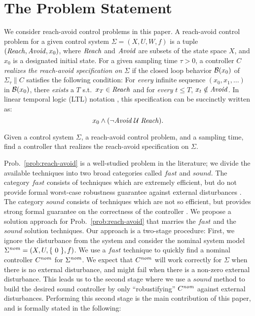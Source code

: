 
\section{The Problem Statement}

We consider reach-avoid control problems in this paper.
A reach-avoid control problem for a given control system $\Sigma=(X,U,W,f)$ is a tuple $(\mathit{Reach},\mathit{Avoid},x_0)$, where $\mathit{Reach}$ and $\mathit{Avoid}$ are subsets of the state space $X$, and $x_0$ is a designated initial state.
For a given sampling time $\tau>0$, a controller $C$ \emph{realizes the reach-avoid specification on} $\Sigma$ if the closed loop behavior $\mathcal{B}(x_0)$ of $\Sigma_\tau\parallel C$ satisfies the following condition: For \emph{every} infinite sequence $(x_0,x_1,\ldots)$ in $\mathcal{B}(x_0)$, there \emph{exists} a $T$ s.t.\ $x_T\in \mathit{Reach}$ and for \emph{every} $t\leq T$, $x_t\notin \mathit{Avoid}$. 
In linear temporal logic (LTL) notation \cite{Baier book}, this specification can be succinctly written as:
\begin{equation}
	x_0 \wedge (\lnot \mathit{Avoid}\; \mathcal{U}\;\mathit{Reach}).
\end{equation}

\begin{problem}\label{prob:reach-avoid}
	Given a control system $\Sigma$, a reach-avoid control problem, and a sampling time, find a controller that realizes the reach-avoid specification on $\Sigma$.
\end{problem}

Prob.~\ref{prob:reach-avoid} is a well-studied problem in the literature; we divide the available techniques into two broad categories called $\mathit{fast}$ and $\mathit{sound}$.
The category $\mathit{fast}$ consists of techniques which are extremely efficient, but do not provide formal worst-case robustness guarantee against external disturbances \cite{Altro, AI and path planning methods}.
The category $\mathit{sound}$ consists of techniques which are not so efficient, but provides strong formal guarantee on the correctness of the controller \cite{ABCD, Hamilton-Jacobi, LQR tree}.
We propose a solution approach for Prob.~\ref{prob:reach-avoid} that marries the $\mathit{fast}$ and the $\mathit{sound}$ solution techniques.
Our approach is a two-stage procedure: 
First, we ignore the disturbance from the system and consider the nominal system model $\Sigma^{\mathit{nom}}=(X,U,\lbrace~0~\rbrace,f)$.
We use a $\mathit{fast}$ technique to quickly find a nominal controller $C^{\mathit{nom}}$ for $\Sigma^{\mathit{nom}}$.
We expect that $C^{\mathit{nom}}$ will work correctly for $\Sigma$ when there is no external disturbance, and might fail when there is a non-zero external disturbance.
This leads us to the second stage where we use a $\mathit{sound}$ method to build the desired sound controller by only ``robustifying'' $C^{\mathit{nom}}$ against external disturbances.
Performing this second stage is the main contribution of this paper, and is formally stated in the following:

